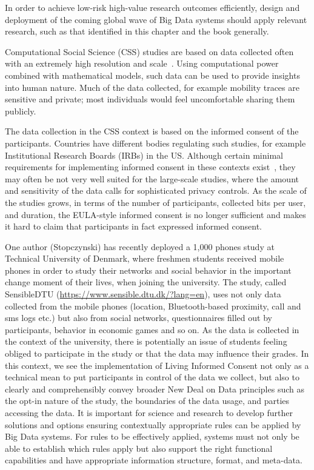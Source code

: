 In order to achieve low-risk high-value research outcomes efficiently, design and deployment of the coming global wave of Big Data systems should apply relevant research, such as that identified in this chapter and the book generally.

Computational Social Science (CSS) studies are based on data collected often with an extremely high resolution and scale~\cite{lazer2009life}.
Using computational power combined with mathematical models, such data can be used to provide insights into human nature.
Much of the data collected, for example mobility traces are sensitive and private; most individuals would feel uncomfortable sharing them publicly.

The data collection in the CSS context is based on the informed consent of the participants. 
Countries have different bodies regulating such studies, for example Institutional Research Boards (IRBs) in the US.
Although certain minimal requirements for implementing informed consent in these contexts exist~\cite{IMM2013-06632}, they may often be not very well suited for the large-scale studies, where the amount and sensitivity of the data calls for sophisticated privacy controls.
As the scale of the studies grows, in terms of the number of participants, collected bits per user, and duration, the EULA-style informed consent is no longer sufficient and makes it hard to claim that participants in fact expressed informed consent.

One author (Stopczynski) has recently deployed a 1,000 phones study at Technical University of Denmark, where freshmen students received mobile phones in order to study their networks and social behavior in the important change moment of their lives, when joining the university.
The study, called SensibleDTU (\url{https://www.sensible.dtu.dk/?lang=en}), uses not only data collected from the mobile phones (location, Bluetooth-based proximity, call and sms logs etc.) but also from social networks, questionnaires filled out by participants, behavior in economic games and so on.
As the data is collected in the context of the university, there is potentially an issue of students feeling obliged to participate in the study or that the data may influence their grades.
In this context, we see the implementation of Living Informed Consent not only as a technical mean to put participants in control of the data we collect, but also to clearly and comprehensibly convey broader New Deal on Data principles such as the opt-in nature of the study, the boundaries of the data usage, and parties accessing the data.
It is important for science and research to develop further solutions and options ensuring contextually appropriate rules can be applied by Big Data systems.
For rules to be effectively applied, systems must not only be able to establish which rules apply but also support the right functional capabilities and have appropriate information structure, format, and meta-data.

